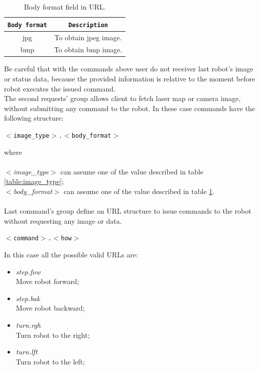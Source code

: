 \begin{table}[!h]
  \centering  
  \begin{tabular}{| c | c |}

    \hline
    \texttt{\bf Body format} &
    \texttt{\bf Description} \\ %

    \hline
    \parbox[t]{6.5cm}{\raggedright \small jpg } &
    \parbox[t]{6cm}{\raggedright \small
      To obtain jpeg image.} \\  [1ex]

    \hline
    \parbox[t]{6.5cm}{\raggedright \small bmp } &
    \parbox[t]{6cm}{\raggedright \small
      To obtain bmp image.} \\  [1ex]
    \hline

  \end{tabular}
  \caption{Body format field in URL.}
  \label{table:body_format}
\end{table}

Be careful that with the commands above user do not receiver last robot's image or
status data, because the provided information is relative to the moment
before robot executes the issued command.
\\
The second requests' group allows client to fetch laser map or camera image,
without submitting any command to the robot. In these case commands have
the following structure:

\begin{center}
  \texttt{$<$image\_type$>$.$<$body\_format$>$}
\end{center}

where \\ \\
\textit{$<$image\_type$>$} can assume one of the value described in table
\ref{table:image_type};\\
\textit{$<$body\_format$>$} can assume one of the value described in table
\ref{table:body_format}. \\
\\
Last command's group define an URL structure to issue commands to the robot
without requesting any image or data.

\begin{center}
  \texttt{$<$command$>$.$<$how$>$}
\end{center}

In this case all the possible valid URLs are:

\begin{itemize}
  \item \textit{step.fow} \\
    Move robot forward;
  \item \textit{step.bak} \\
    Move robot backward;
  \item \textit{turn.rgh} \\
    Turn robot to the right;
  \item \textit{turn.lft} \\
    Turn robot to the left;
\end{itemize}

